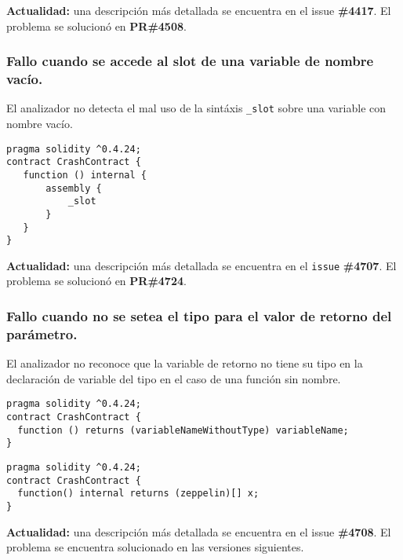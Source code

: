 \textbf{Actualidad:} una descripción más detallada se encuentra en el issue \textbf{\#4417}\cite{GHI4417}. El problema se solucionó en \textbf{PR\#4508}\cite{GHPR4508}.\\

\subsubsection{Fallo cuando se accede al slot de una variable de nombre vacío.}

El analizador no detecta el mal uso de la sintáxis \texttt{\_slot} sobre una variable con nombre vacío.\\

\begin{lstlisting}[language=Solidity, caption={Código de ejemplo para fallo con \texttt{\_slot}}]
pragma solidity ^0.4.24;
contract CrashContract {
   function () internal {
       assembly {
           _slot
       }
   }
}
\end{lstlisting}

\textbf{Actualidad:} una descripción más detallada se encuentra en el \texttt{issue} \textbf{\#4707}\cite{GHI4707}. El problema se solucionó en \textbf{PR\#4724}\cite{GHPR4724}.\\

\subsubsection{Fallo cuando no se setea el tipo para el valor de retorno del parámetro.}

El analizador no reconoce que la variable de retorno no tiene su tipo en la declaración de variable del tipo en el caso de una función sin nombre.\\

\begin{lstlisting}[language=Solidity, caption={Código de ejemplo para fallo con valor de retorno sin tipo \#1}]
pragma solidity ^0.4.24;
contract CrashContract {
  function () returns (variableNameWithoutType) variableName;
}
\end{lstlisting}

\begin{lstlisting}[language=Solidity, caption={Código de ejemplo para fallo con valor de retorno sin tipo \#2}]
pragma solidity ^0.4.24;
contract CrashContract {
  function() internal returns (zeppelin)[] x;
}
\end{lstlisting}

\textbf{Actualidad:} una descripción más detallada se encuentra en el issue \textbf{\#4708}\cite{GHI4708}. El problema se encuentra solucionado en las versiones siguientes. \\

